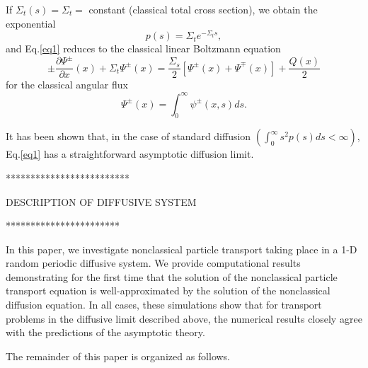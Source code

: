 \documentclass{anstrans}
\begin{document}
If $\Sigma_t(s) = \Sigma_t = $ constant (classical total cross section), we obtain the exponential
\begin{equation}\label{eq5}
p(s) = \Sigma_t e^{-\Sigma_ts},
\end{equation}
and Eq.\eqref{eq1} reduces to the classical linear Boltzmann equation
\begin{equation}
\label{eq6}
\pm \frac{\partial \Psi^\pm}{\partial x}(x) + \Sigma_t \Psi^\pm(x) = \frac{\Sigma_s}{2}\left[\Psi^\pm(x)+\Psi^\mp(x)\right]+ \frac{Q(x)}{2}
\end{equation}
for the classical angular flux 
\begin{equation}
\label{eq7}
\Psi^\pm(x) = \int_0^\infty \psi^\pm(x,s)ds.
\end{equation} 

It has been shown that, in the case of standard diffusion $\left(\int_0^{\infty} s^2p(s)ds < \infty\right)$,  Eq.\eqref{eq1} has a straightforward asymptotic diffusion limit.  

*************************

DESCRIPTION OF DIFFUSIVE SYSTEM

***********************

In this paper, we investigate nonclassical particle transport taking place in a 1-D random periodic diffusive system. We provide computational results demonstrating for the first time that the solution of the nonclassical particle
transport equation is well-approximated by the solution of the nonclassical diffusion equation. In all cases, these
simulations show that for transport problems in the diffusive limit described above, the numerical results closely agree with the predictions of the asymptotic theory. 

The remainder of this paper is organized as follows.


\end{document}
